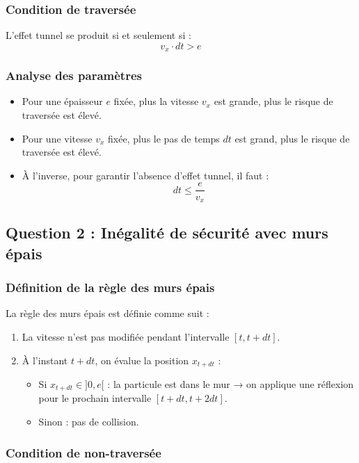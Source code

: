 \documentclass[12pt,a4paper]{report}
\begin{document}
\subsubsection{Condition de traversée}

L'effet tunnel se produit si et seulement si :
\[
\boxed{v_x \cdot dt > e}
\]

\subsubsection{Analyse des paramètres}

\begin{itemize}
    \item Pour une épaisseur $e$ fixée, plus la vitesse $v_x$ est grande, plus le risque de traversée est élevé.
    \item Pour une vitesse $v_x$ fixée, plus le pas de temps $dt$ est grand, plus le risque de traversée est élevé.
    \item À l'inverse, pour garantir l'absence d'effet tunnel, il faut :
    \[
    dt \leq \frac{e}{v_x}
    \]
\end{itemize}

\subsection{Question 2 : Inégalité de sécurité avec murs épais}

\subsubsection{Définition de la règle des murs épais}

La règle des murs épais est définie comme suit :
\begin{enumerate}
    \item La vitesse n'est pas modifiée pendant l'intervalle $[t, t+dt]$.
    \item À l'instant $t+dt$, on évalue la position $x_{t+dt}$ :
    \begin{itemize}
        \item Si $x_{t+dt} \in ]0, e[$ : la particule est dans le mur → on applique une réflexion pour le prochain intervalle $[t+dt, t+2dt]$.
        \item Sinon : pas de collision.
    \end{itemize}
\end{enumerate}

\subsubsection{Condition de non-traversée}
\end{document}
